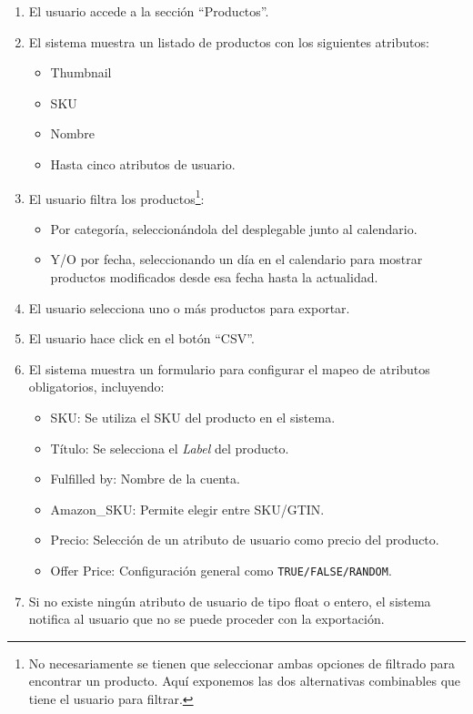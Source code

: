 \begin{enumerate}
    \item El usuario accede a la sección \enquote{Productos}.
    \item El sistema muestra un listado de productos con los siguientes atributos:
    \begin{itemize}
        \item Thumbnail
        \item SKU
        \item Nombre
        \item Hasta cinco atributos de usuario.
    \end{itemize}
    \item El usuario filtra los productos\footnote{No necesariamente se tienen que seleccionar ambas opciones de filtrado para encontrar un producto. Aquí exponemos las dos alternativas combinables que tiene el usuario para filtrar.}:
    \begin{itemize}
        \item Por categoría, seleccionándola del desplegable junto al calendario.
        \item Y/O por fecha, seleccionando un día en el calendario para mostrar productos modificados desde esa fecha hasta la actualidad.
    \end{itemize}
    \item El usuario selecciona uno o más productos para exportar.
    \item El usuario hace click en el botón \enquote{CSV}.
    \item El sistema muestra un formulario para configurar el mapeo de atributos obligatorios, incluyendo:
    \begin{itemize}
        \item SKU: Se utiliza el SKU del producto en el sistema.
        \item Título: Se selecciona el \textit{Label} del producto.
        \item Fulfilled by: Nombre de la cuenta.
        \item Amazon\_SKU: Permite elegir entre SKU/GTIN.
        \item Precio: Selección de un atributo de usuario como precio del producto.
        \item Offer Price: Configuración general como \texttt{TRUE/FALSE/RANDOM}.
    \end{itemize}
    \item Si no existe ningún atributo de usuario de tipo float o entero, el sistema notifica al usuario que no se puede proceder con la exportación.

\end{enumerate}
